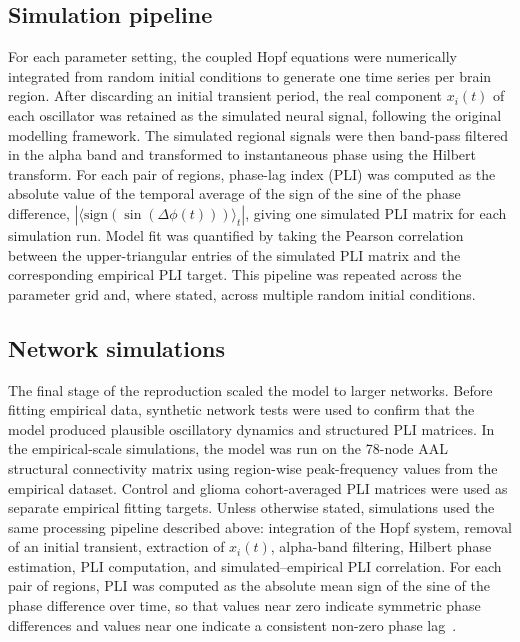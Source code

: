 \documentclass[11pt, reprint, aps, prl, floatfix, secnumarabic]{revtex4-2}
\begin{document}
\subsection{Simulation pipeline}
For each parameter setting, the coupled Hopf equations were numerically integrated from random initial conditions to generate one time series per brain region. After discarding an initial transient period, the real component \(x_i(t)\) of each oscillator was retained as the simulated neural signal, following the original modelling framework. The simulated regional signals were then band-pass filtered in the alpha band and transformed to instantaneous phase using the Hilbert transform. For each pair of regions, phase-lag index (PLI) was computed as the absolute value of the temporal average of the sign of the sine of the phase difference, $\left|\langle \mathrm{sign}(\sin(\Delta\phi(t))) \rangle_t\right|$, giving one simulated PLI matrix for each simulation run. Model fit was quantified by taking the Pearson correlation between the upper-triangular entries of the simulated PLI matrix and the corresponding empirical PLI target. This pipeline was repeated across the parameter grid and, where stated, across multiple random initial conditions.

\subsection{Network simulations}
The final stage of the reproduction scaled the model to larger networks. Before fitting empirical data, synthetic network tests were used to confirm that the model produced plausible oscillatory dynamics and structured PLI matrices.
In the empirical-scale simulations, the model was run on the 78-node AAL structural connectivity matrix using region-wise peak-frequency values from the empirical dataset. Control and glioma cohort-averaged PLI matrices were used as separate empirical fitting targets. Unless otherwise stated, simulations used the same processing pipeline described above: integration of the Hopf system, removal of an initial transient, extraction of \(x_i(t)\), alpha-band filtering, Hilbert phase estimation, PLI computation, and simulated--empirical PLI correlation. For each pair of regions, PLI was computed as the absolute mean sign of the sine of the phase difference over time, so that values near zero indicate symmetric phase differences and values near one indicate a consistent non-zero phase lag~\cite{Stam2007}. 
\end{document}
